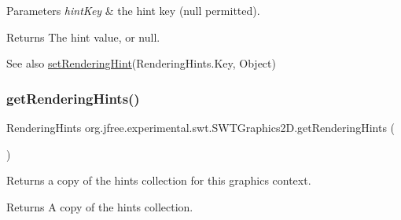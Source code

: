 \begin{DoxyParams}{Parameters}
{\em hint\+Key} & the hint key ({\ttfamily null} permitted).\\
\hline
\end{DoxyParams}
\begin{DoxyReturn}{Returns}
The hint value, or {\ttfamily null}.
\end{DoxyReturn}
\begin{DoxySeeAlso}{See also}
\mbox{\hyperlink{classorg_1_1jfree_1_1experimental_1_1swt_1_1_s_w_t_graphics2_d_a9f2008ec82fdd536a5e68de42a31992a}{set\+Rendering\+Hint}}(Rendering\+Hints.\+Key, Object) 
\end{DoxySeeAlso}
\mbox{\label{classorg_1_1jfree_1_1experimental_1_1swt_1_1_s_w_t_graphics2_d_a8a936ffeb9c6d133f1fe91ffcd87b319}} 
\subsubsection{\texorpdfstring{get\+Rendering\+Hints()}{getRenderingHints()}}
{\footnotesize\ttfamily Rendering\+Hints org.\+jfree.\+experimental.\+swt.\+S\+W\+T\+Graphics2\+D.\+get\+Rendering\+Hints (\begin{DoxyParamCaption}{ }\end{DoxyParamCaption})}

Returns a copy of the hints collection for this graphics context.

\begin{DoxyReturn}{Returns}
A copy of the hints collection. 
\end{DoxyReturn}
\mbox{\label{classorg_1_1jfree_1_1experimental_1_1swt_1_1_s_w_t_graphics2_d_ab44f8c6b4ef40396fa3c34e7be4b2b7a}} 
